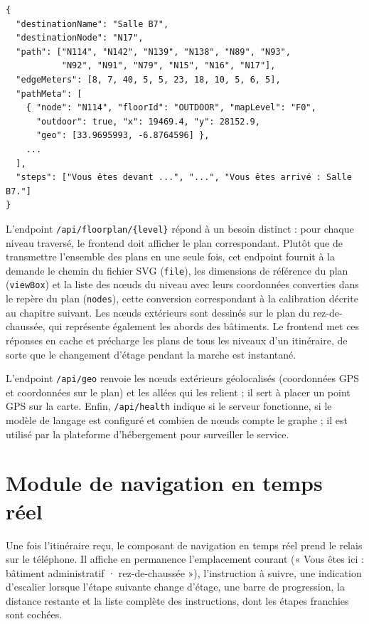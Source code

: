 \documentclass[12pt,a4paper]{report}
\begin{document}
\begin{lstlisting}[caption={Extrait simplifié d'une réponse de \texttt{/api/navigate}}, label={lst:reponse}]
{
  "destinationName": "Salle B7",
  "destinationNode": "N17",
  "path": ["N114", "N142", "N139", "N138", "N89", "N93",
           "N92", "N91", "N79", "N15", "N16", "N17"],
  "edgeMeters": [8, 7, 40, 5, 5, 23, 18, 10, 5, 6, 5],
  "pathMeta": [
    { "node": "N114", "floorId": "OUTDOOR", "mapLevel": "F0",
      "outdoor": true, "x": 19469.4, "y": 28152.9,
      "geo": [33.9695993, -6.8764596] },
    ...
  ],
  "steps": ["Vous êtes devant ...", "...", "Vous êtes arrivé : Salle B7."]
}
\end{lstlisting}

L'endpoint \texttt{/api/floorplan/\{level\}} répond à un besoin distinct : pour chaque niveau
traversé, le frontend doit afficher le plan correspondant. Plutôt que de transmettre l'ensemble des
plans en une seule fois, cet endpoint fournit à la demande le chemin du fichier SVG (\texttt{file}),
les dimensions de référence du plan (\texttt{viewBox}) et la liste des nœuds du niveau avec leurs
coordonnées converties dans le repère du plan (\texttt{nodes}), cette conversion correspondant à la
calibration décrite au chapitre suivant. Les nœuds extérieurs sont dessinés sur le plan du
rez-de-chaussée, qui représente également les abords des bâtiments. Le frontend met ces réponses
en cache et précharge les plans de tous les niveaux d'un itinéraire, de sorte que le changement
d'étage pendant la marche est instantané.

L'endpoint \texttt{/api/geo} renvoie les nœuds extérieurs géolocalisés (coordonnées GPS et
coordonnées sur le plan) et les allées qui les relient ; il sert à placer un point GPS sur la carte.
Enfin, \texttt{/api/health} indique si le serveur fonctionne, si le modèle de langage est configuré
et combien de nœuds compte le graphe ; il est utilisé par la plateforme d'hébergement pour
surveiller le service.

\section{Module de navigation en temps réel}
\label{sec:live}

Une fois l'itinéraire reçu, le composant de navigation en temps réel prend le relais sur le
téléphone. Il affiche en permanence l'emplacement courant (« Vous êtes ici : bâtiment
administratif · rez-de-chaussée »), l'instruction à suivre, une indication d'escalier lorsque
l'étape suivante change d'étage, une barre de progression, la distance restante et la liste
complète des instructions, dont les étapes franchies sont cochées.
\end{document}
